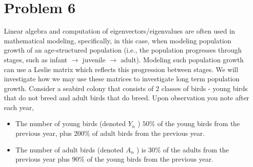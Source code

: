 \documentclass[letter,11pt]{article}
\theoremstyle{definition}
\begin{document}
\section{Problem 6}
Linear algebra and computation of eigenvectors/eigenvalues are often used in mathematical modeling, specifically, in this case, when modeling population growth of an age-structured population (i.e., the population progresses through stages, such as infant $\rightarrow$ juvenile $\rightarrow$ adult). Modeling such population growth can use a Leslie matrix which reflects this progression between stages. We will investigate how we may use these matrices to investigate long term population growth.
Consider a seabird colony that consists of 2 classes of birds - young birds that do not breed and adult birds that do breed. Upon observation you note after each year,

\begin{itemize}
    \item The number of young birds (denoted $Y_n$ ) $50 \%$ of the young birds from the previous year, plus $200 \%$ of adult birds from the previous year.
    \item The number of adult birds (denoted $A_n$ ) is $30 \%$ of the adults from the previous year plus $90 \%$ of the young birds from the previous year.
\end{itemize}
\end{document}
